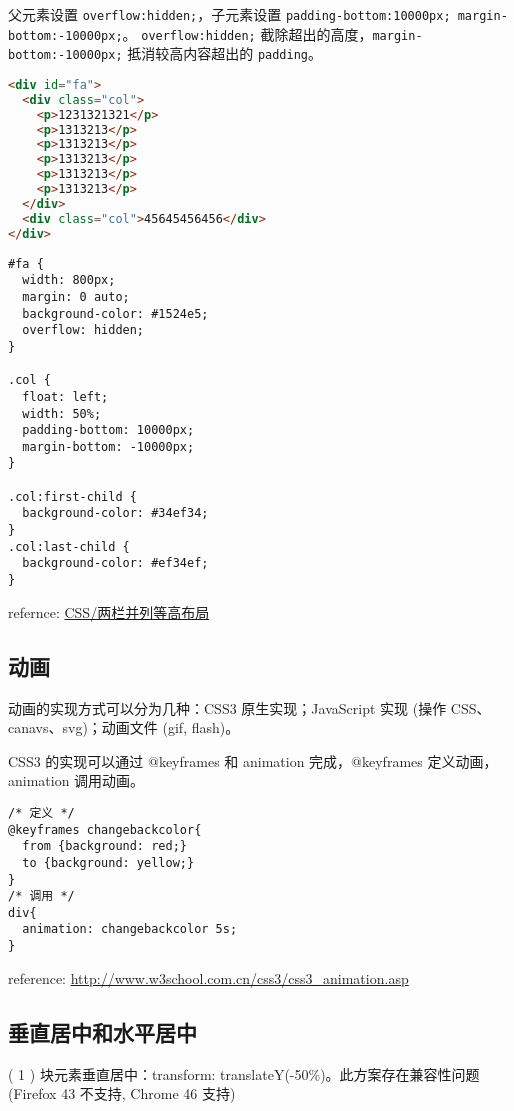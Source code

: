 父元素设置 \lstinline!overflow:hidden;!，子元素设置
\lstinline!padding-bottom:10000px; margin-bottom:-10000px;!。
\lstinline!overflow:hidden;!
截除超出的高度，\lstinline!margin-bottom:-10000px;! 抵消较高内容超出的
\lstinline!padding!。

\begin{lstlisting}[language=HTML]
<div id="fa">
  <div class="col">
    <p>1231321321</p>
    <p>1313213</p>
    <p>1313213</p>
    <p>1313213</p>
    <p>1313213</p>
    <p>1313213</p>
  </div>
  <div class="col">45645456456</div>
</div>
\end{lstlisting}

\begin{lstlisting}
#fa {
  width: 800px;
  margin: 0 auto;
  background-color: #1524e5;
  overflow: hidden;
}

.col {
  float: left;
  width: 50%;
  padding-bottom: 10000px;
  margin-bottom: -10000px;
}

.col:first-child {
  background-color: #34ef34;
}
.col:last-child {
  background-color: #ef34ef;
}
\end{lstlisting}

refernce:
\href{http://segmentfault.com/a/1190000000625584}{CSS/两栏并列等高布局}

\subsection{动画}\label{ux52a8ux753b}

动画的实现方式可以分为几种：CSS3 原生实现；JavaScript 实现 (操作
CSS、canavs、svg)；动画文件 (gif, flash)。

CSS3 的实现可以通过 @keyframes 和 animation 完成，@keyframes
定义动画，animation 调用动画。

\begin{lstlisting}
/* 定义 */
@keyframes changebackcolor{
  from {background: red;}
  to {background: yellow;}
}
/* 调用 */
div{
  animation: changebackcolor 5s;
}
\end{lstlisting}

reference: \url{http://www.w3school.com.cn/css3/css3_animation.asp}

\subsection{垂直居中和水平居中}\label{ux5782ux76f4ux5c45ux4e2dux548cux6c34ux5e73ux5c45ux4e2d}

( 1 ) 块元素垂直居中：transform:
translateY(-50\%)。此方案存在兼容性问题(Firefox 43 不支持, Chrome 46
支持)

